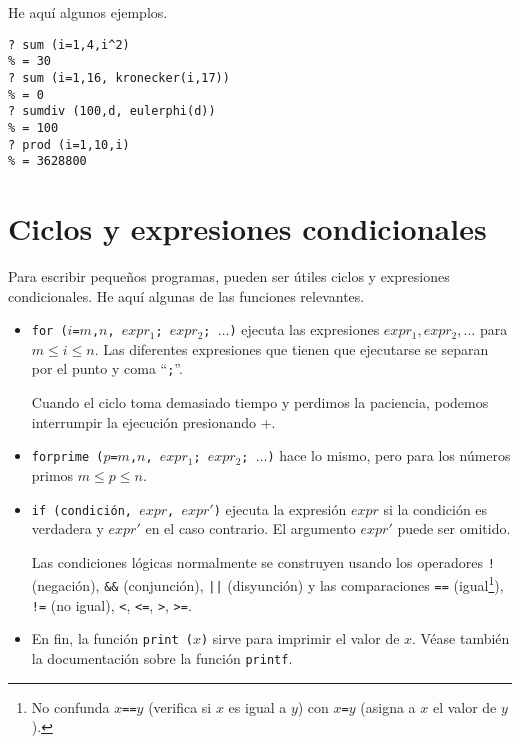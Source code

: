 He aquí algunos ejemplos.

\begin{framed}\footnotesize
\begin{verbatim}
? sum (i=1,4,i^2)
% = 30
? sum (i=1,16, kronecker(i,17))
% = 0
? sumdiv (100,d, eulerphi(d))
% = 100
? prod (i=1,10,i)
% = 3628800
\end{verbatim}
\end{framed}


\section{Ciclos y expresiones condicionales}

Para escribir pequeños programas, pueden ser útiles ciclos y expresiones
condicionales. He aquí algunas de las funciones relevantes.

\begin{itemize}
\item \texttt{for\,($i$=$m$,$n$, $expr_1$; $expr_2$; $\ldots$)} ejecuta
  las expresiones $expr_1, expr_2, \ldots$ para $m \le i \le n$. Las diferentes
  expresiones que tienen que ejecutarse se separan por el punto y coma
  ``\texttt{;}''.

  Cuando el ciclo toma demasiado tiempo y perdimos la paciencia, podemos
  interrumpir la ejecución presionando +.

\item \texttt{forprime\,($p$=$m$,$n$, $expr_1$; $expr_2$; $\ldots$)} hace
  lo mismo, pero para los números primos $m \le p\le n$.

\item \texttt{if\,(condición, $expr$, $expr'$)} ejecuta la expresión $expr$ si
  la condición es verdadera y $expr'$ en el caso contrario. El argumento $expr'$
  puede ser omitido.

  Las condiciones lógicas normalmente se construyen usando los operadores
  \texttt{!} (negación), \texttt{\&\&} (conjunción), \texttt{||} (disyunción) y
  las comparaciones \texttt{==} (igual\footnote{No confunda \texttt{$x$==$y$}
    (verifica si $x$ es igual a $y$) con \texttt{$x$=$y$} (asigna a $x$ el valor
    de $y$).}), \texttt{!=} (no igual), \texttt{<}, \texttt{<=}, \texttt{>},
  \texttt{>=}.

\item En fin, la función \texttt{print\,($x$)} sirve para imprimir el valor de
  $x$. Véase también la documentación sobre la función \texttt{printf}.
\end{itemize}

